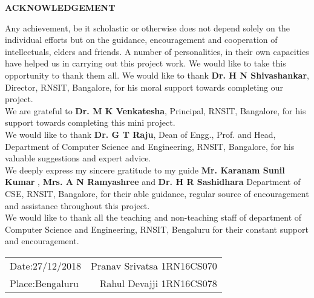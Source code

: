 \thispagestyle{empty}
\begin{center}
\textup{\large{\textbf{ACKNOWLEDGEMENT}}} \\[0.1in]
\end{center}
\justify
\indent
Any achievement, be it scholastic or otherwise does not depend solely on the individual efforts but on the guidance, encouragement and cooperation of intellectuals, elders and friends. A number of personalities, in their own capacities have helped us in carrying out this project work. We would like to take this opportunity to thank them all.
We would like to thank \textbf{Dr. H N Shivashankar}, Director, RNSIT, Bangalore, for his moral support towards completing our project.\\
We are grateful to \textbf{Dr. M K Venkatesha}, Principal, RNSIT, Bangalore, for his support towards completing this mini project.\\
We would like to thank \textbf{Dr. G T Raju}, Dean of Engg., Prof. and Head, Department of Computer Science and Engineering, RNSIT, Bangalore, for his valuable suggestions and expert advice.\\
We deeply express my sincere gratitude to my guide \textbf{Mr. Karanam Sunil Kumar} , \textbf{Mrs. A N Ramyashree} and \textbf{Dr. H R Sashidhara} Department of CSE, RNSIT, Bangalore, for their able guidance, regular source of encouragement and assistance throughout this project.\\[.2in]
We would like to thank all the teaching and non-teaching staff of department of Computer Science and Engineering, RNSIT, Bengaluru for their constant support and encouragement.\\[2in]
\justify
\begin{tabular}{l r}
\textup{Date:27/12/2018} & \hspace{9cm}\textup{Pranav Srivatsa 1RN16CS070}\\
\textup{Place:Bengaluru} & \hspace{9cm}\textup{Rahul Devajji 1RN16CS078}
\end{tabular}


\pagebreak
